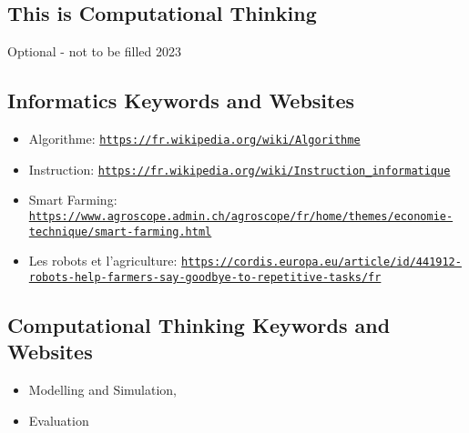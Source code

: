 \documentclass[a4paper,11pt]{report}
\newcommand{\BrochureUrlText}[1]{\texttt{#1}}
\begin{document}
\subsection*{This is Computational Thinking}

Optional - not to be filled 2023


\subsection*{Informatics Keywords and Websites}

\begin{itemize}
  \item Algorithme: \href{https://fr.wikipedia.org/wiki/Algorithme}{\BrochureUrlText{https://fr.wikipedia.org/wiki/Algorithme}}
  \item Instruction: \href{https://fr.wikipedia.org/wiki/Instruction_informatique}{\BrochureUrlText{https://fr.wikipedia.org/wiki/Instruction\_informatique}}
  \item Smart Farming: \href{https://www.agroscope.admin.ch/agroscope/fr/home/themes/economie-technique/smart-farming.html}{\BrochureUrlText{https://www.agroscope.admin.ch/agroscope/fr/home/themes/economie-technique/smart-farming.html}}
  \item Les robots et l’agriculture: \href{https://cordis.europa.eu/article/id/441912-robots-help-farmers-say-goodbye-to-repetitive-tasks/fr}{\BrochureUrlText{https://cordis.europa.eu/article/id/441912-robots-help-farmers-say-goodbye-to-repetitive-tasks/fr}}
\end{itemize}


\subsection*{Computational Thinking Keywords and Websites}

\begin{itemize}
  \item Modelling and Simulation,
  \item Evaluation
\end{itemize}
\end{document}
